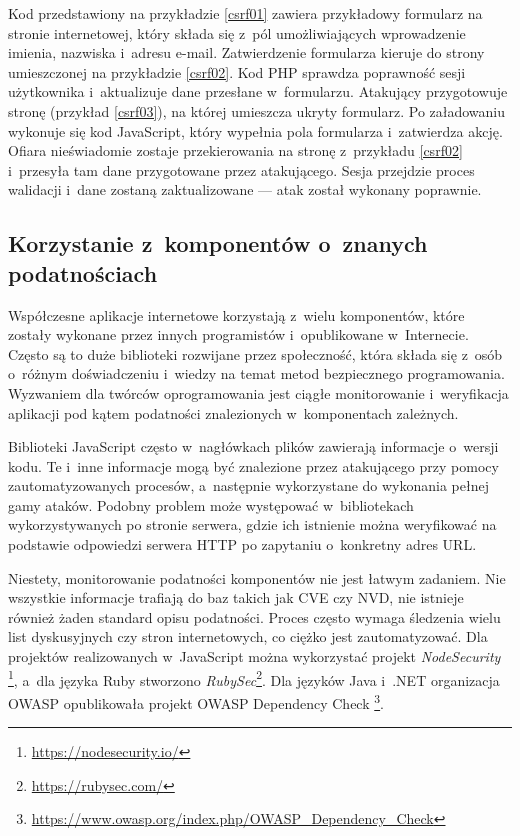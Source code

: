 \documentclass[12pt,a4paper,polish,thesis]{dcsbook}
\begin{document}
Kod przedstawiony na przykładzie \ref{csrf01} zawiera przykładowy formularz na stronie internetowej, który składa się z~pól umożliwiających wprowadzenie imienia, nazwiska i~adresu e-mail. Zatwierdzenie formularza kieruje do strony umieszczonej na przykładzie \ref{csrf02}. Kod PHP sprawdza poprawność sesji użytkownika i~aktualizuje dane przesłane w~formularzu. Atakujący przygotowuje stronę (przykład \ref{csrf03}), na której umieszcza ukryty formularz. Po załadowaniu wykonuje się kod JavaScript, który wypełnia pola formularza i~zatwierdza akcję. Ofiara nieświadomie zostaje przekierowania na stronę z~przykładu \ref{csrf02} i~przesyła tam dane przygotowane przez atakującego. Sesja przejdzie proces walidacji i~dane zostaną zaktualizowane --- atak został wykonany poprawnie.

\subsection{Korzystanie z~komponentów o~znanych podatnościach}
Współczesne aplikacje internetowe korzystają z~wielu komponentów, które zostały wykonane przez innych programistów i~opublikowane w~Internecie. Często są to duże biblioteki rozwijane przez społeczność, która składa się z~osób o~różnym doświadczeniu i~wiedzy na temat metod bezpiecznego programowania. Wyzwaniem dla twórców oprogramowania jest ciągłe monitorowanie i~weryfikacja aplikacji pod kątem podatności znalezionych w~komponentach zależnych. 

Biblioteki JavaScript często w~nagłówkach plików zawierają informacje o~wersji kodu. Te i~inne informacje mogą być znalezione przez atakującego przy pomocy zautomatyzowanych procesów, a~następnie wykorzystane do wykonania pełnej gamy ataków. Podobny problem może występować w~bibliotekach wykorzystywanych po stronie serwera, gdzie ich istnienie można weryfikować na podstawie odpowiedzi serwera HTTP po zapytaniu o~konkretny adres URL. 

Niestety, monitorowanie podatności komponentów nie jest łatwym zadaniem. Nie wszystkie informacje trafiają do baz takich jak CVE czy NVD, nie istnieje również żaden standard opisu podatności. Proces często wymaga śledzenia wielu list dyskusyjnych czy stron internetowych, co ciężko jest zautomatyzować. Dla projektów realizowanych w~JavaScript można wykorzystać projekt \textit{NodeSecurity} \footnote{\url{https://nodesecurity.io/}}, a~dla języka Ruby stworzono \textit{RubySec}\footnote{\url{https://rubysec.com/}}. Dla języków Java i~.NET organizacja OWASP opublikowała projekt OWASP Dependency Check \footnote{\url{https://www.owasp.org/index.php/OWASP\_Dependency\_Check}}.
\end{document}
